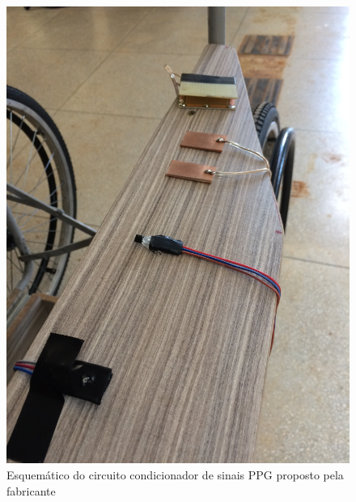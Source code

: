 \begin{figure}[h!]
    \begin{center}
        \includegraphics[scale=0.07]{figuras/psem2.jpg}
    \end{center}
    \caption{Esquemático do circuito condicionador de sinais PPG proposto pela fabricante}
    \label{fig:psem2}
\end{figure}
